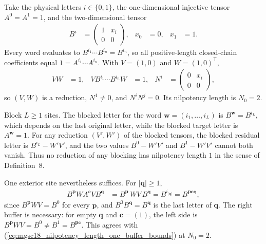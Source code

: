 \documentclass{article}
\begin{document}
Take the physical letters $i\in\{0,1\}$, the one-dimensional injective
tensor $A^0=A^1=1$, and the two-dimensional tensor
\begin{align}
    B^i
        &=\begin{pmatrix}
             1&x_i\\
             0&0
          \end{pmatrix},
    &x_0
        &=0,
    &x_1
        &=1.
    \label{eq:mgsc18_nilpotency_length_one_example_tensor}
\end{align}
Every word evaluates to $B^{i_1}\cdots B^{i_n}=B^{i_n}$, so all
positive-length closed-chain coefficients equal $1=A^{i_1}\cdots A^{i_n}$.
With $V=(1,0)$ and $W=(1,0)^{\mathsf T}$,
\begin{align}
    VW
        &=1,
    &VB^{i_1}\cdots B^{i_n}W
        &=1,
    &N^i
        &=\begin{pmatrix}
             0&x_i\\
             0&0
          \end{pmatrix},
    \label{eq:mgsc18_nilpotency_length_one_example_reduction}
\end{align}
so $(V,W)$ is a reduction, $N^1\neq0$, and $N^iN^j=0$.  Its nilpotency
length is $N_0=2$.

Block $L\geq1$ sites.  The blocked letter for the word
$\mathbf w=(i_1,\ldots,i_L)$ is $B^{\mathbf w}=B^{i_L}$, which depends on
the last original letter, while the blocked target letter is
$A^{\mathbf w}=1$.  For any reduction $(V',W')$ of the blocked tensors, the
blocked residual letter is $B^{i_L}-W'V'$, and the two values
$B^0-W'V'$ and $B^1-W'V'$ cannot both vanish.  Thus no reduction of any
blocking has nilpotency length $1$ in the sense of Definition~8.

One exterior site nevertheless suffices.  For $|\mathbf q|\geq1$,
\begin{align}
    B^{\mathbf p}WA^{\mathbf c}VB^{\mathbf q}
        &=B^{\mathbf p}\,WV\,B^{\mathbf q}
         =B^{i_{|\mathbf q|}}
         =B^{\mathbf p\mathbf c\mathbf q},
    \label{eq:mgsc18_nilpotency_length_one_example_exterior}
\end{align}
since $B^{\mathbf p}WV=B^0$ for every $\mathbf p$, and
$B^0B^{\mathbf q}=B^{\mathbf q}$ is the last letter of $\mathbf q$.  The
right buffer is necessary: for empty $\mathbf q$ and $\mathbf c=(1)$, the
left side is $B^{\mathbf p}WV=B^0\neq B^1=B^{\mathbf p\mathbf c}$.  This
agrees with (\ref{eq:mgsc18_nilpotency_length_one_buffer_bounds}) at
$N_0=2$.
\end{document}
